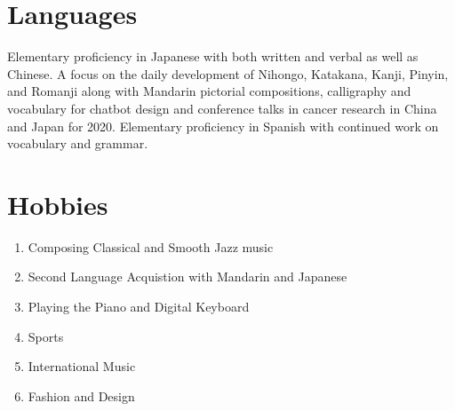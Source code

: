 \documentclass{TMLSStyleGuideResumeVitae}
\begin{document}
\section{Languages}
Elementary proficiency in Japanese with both written and verbal as well as Chinese.  
A focus on the daily development of Nihongo, Katakana, Kanji, Pinyin, and Romanji along with Mandarin pictorial
compositions, calligraphy and vocabulary for chatbot design and conference talks in cancer research in China and Japan for 2020.  
Elementary proficiency in Spanish with continued work on vocabulary and grammar.

\section{Hobbies}

\begin{enumerate}
\item Composing Classical and Smooth Jazz music
\item Second Language Acquistion with Mandarin and Japanese
\item Playing the Piano and Digital Keyboard 
\item Sports
\item International Music
\item Fashion and Design
\end{enumerate}
\end{document}
